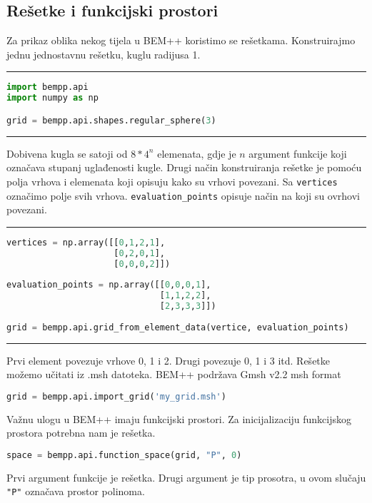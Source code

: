 \documentclass[a4paper,twoside,12pt]{memoir} %
\begin{document}
\subsection{Rešetke i funkcijski prostori}
Za prikaz oblika nekog tijela u BEM++ koristimo se rešetkama. Konstruirajmo jednu jednostavnu rešetku, kuglu radijusa 1. \\
\hrule
\begin{lstlisting}[language=Python]
import bempp.api
import numpy as np

grid = bempp.api.shapes.regular_sphere(3)
\end{lstlisting}
\hrule 
\vspace{.5cm}
Dobivena kugla se satoji od $8*4^{n}$ elemenata, gdje je $n$ argument funkcije koji označava stupanj uglađenosti kugle. 
Drugi način konstruiranja rešetke je pomoću polja vrhova i elemenata koji opisuju kako su vrhovi povezani. Sa \texttt{vertices} označimo polje svih vrhova. \texttt{evaluation\_points} opisuje način na koji su ovrhovi povezani.  \\
\hrule
\begin{lstlisting}[language=Python]
vertices = np.array([[0,1,2,1],
                     [0,2,0,1],
                     [0,0,0,2]])
                     
evaluation_points = np.array([[0,0,0,1],
                              [1,1,2,2],
                              [2,3,3,3]])
                              
grid = bempp.api.grid_from_element_data(vertice, evaluation_points)
\end{lstlisting} 
\hrule
\vspace{.5cm}
Prvi element povezuje vrhove 0, 1 i 2. Drugi povezuje 0, 1 i 3 itd. 
Rešetke možemo učitati iz .msh datoteka. BEM++ podržava Gmsh v2.2 msh format
\begin{lstlisting}[language=Python]                                                       
grid = bempp.api.import_grid('my_grid.msh')
\end{lstlisting}
Važnu ulogu u BEM++ imaju funkcijski prostori. Za inicijalizaciju funkcijskog prostora potrebna nam je rešetka. 
\begin{lstlisting}[language=Python]                                                       
space = bempp.api.function_space(grid, "P", 0)
\end{lstlisting} 
Prvi argument funkcije je rešetka. Drugi argument je tip prosotra, u ovom slučaju \texttt{"P"} označava  prostor polinoma. 
\end{document}
